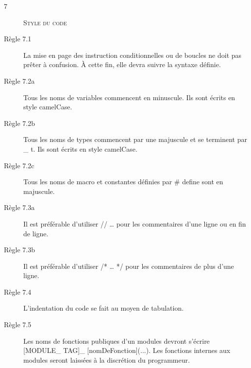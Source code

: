 \begin{description}
\item[7] \textsc{Style du code}
\item[Règle 7.1] La mise en page des instruction conditionnelles ou de boucles ne doit pas prêter à confusion. À cette fin, elle devra suivre la syntaxe définie.
\item[Règle 7.2a] Tous les noms de variables commencent en minuscule. Ils sont écrits en style camelCase.
\item[Règle 7.2b] Tous les noms de types commencent par une majuscule et se terminent par \_ t. Ils sont écrits en style camelCase.
\item[Règle 7.2c] Tous les noms de macro et constantes définies par \# define sont en majuscule.
\item[Règle 7.3a] Il est préférable d’utiliser // … pour les commentaires d’une ligne ou en fin de ligne.
\item[Règle 7.3b] Il est préférable d’utiliser /* … */ pour les commentaires de plus d’une ligne.
\item[Règle 7.4] L’indentation du code se fait au moyen de tabulation.
\item[Règle 7.5] Les noms de fonctions publiques d’un modules devront s’écrire [MODULE\_ TAG]\_ [nomDeFonction](...). Les fonctions internes aux modules seront laissées à la discrétion du programmeur.

\end{description}

\pagebreak